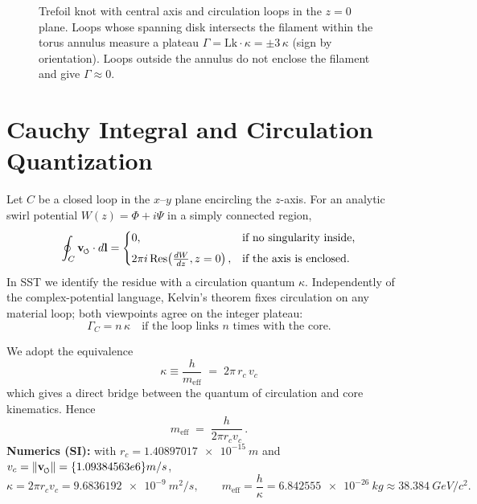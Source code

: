\documentclass[reprint,aps,onecolumn,nofootinbib]{revtex4-2}
\newcommand{\swirlarrow}{%
    \mathchoice{\mkern-2mu\scriptstyle\boldsymbol{\circlearrowleft}}%
    {\mkern-2mu\scriptstyle\boldsymbol{\circlearrowleft}}%
    {\mkern-2mu\scriptscriptstyle\boldsymbol{\circlearrowleft}}%
    {\mkern-2mu\scriptscriptstyle\boldsymbol{\circlearrowleft}}%
}
\newcommand{\vswirl}{\mathbf{v}_{\swirlarrow}}
\begin{document}
\begin{figure}[htbp]
        \caption{Trefoil knot with central axis and circulation loops in the \(z{=}0\) plane.
        Loops whose spanning disk intersects the filament within the torus annulus measure a plateau \(\Gamma=\mathrm{Lk}\cdot\kappa=\pm 3\,\kappa\) (sign by orientation).
        Loops outside the annulus do not enclose the filament and give \(\Gamma\approx 0\).}
        \label{fig:trefoil_axis_plateau_clean}
    \end{figure}


\section{Cauchy Integral and Circulation Quantization}
    Let $C$ be a closed loop in the $x$–$y$ plane encircling the $z$-axis. For an analytic swirl potential $W(z)=\Phi+i\Psi$ in a simply connected region,
    \begin{equation}
        \oint_C \vswirl \cdot d\mathbf{l} =
        \begin{cases}
            0, & \text{if no singularity inside,}\\[4pt]
            2\pi i\, \mathrm{Res}\!\left(\frac{dW}{dz}, z=0\right), & \text{if the axis is enclosed.}
        \end{cases}\label{eq:cauchy-circulation}
    \end{equation}
    In SST we identify the residue with a circulation quantum $\kappa$. Independently of the complex-potential language, Kelvin’s theorem fixes circulation on any material loop; both viewpoints agree on the integer plateau:
    \begin{equation}
        \Gamma_C = n\,\kappa \quad \text{if the loop links $n$ times with the core.}
        \label{eq:circulation-quantization}
    \end{equation}

    \begin{tcolorbox}[title=\textbf{Canonical identification of $\kappa$ (SST)}]
        We adopt the equivalence
        \[
            \boxed{\;\kappa \equiv \frac{h}{m_{\text{eff}}} \;=\; 2\pi\, r_c\, v_c\;}
        \]
        which gives a direct bridge between the quantum of circulation and core kinematics. Hence
        \[
            m_{\text{eff}} \;=\; \frac{h}{2\pi r_c v_c}\,.
        \]
        \textbf{Numerics (SI):} with $r_c=\qty{1.40897017e-15}{m}$ and $v_c=\lVert \mathbf{v}_{\swirlarrow}\rVert=\qty{1.09384563e6}{m/s}$,
        \[
            \kappa=2\pi r_c v_c=\qty{9.6836192e-9}{m^2/s},\qquad
            m_{\text{eff}}=\frac{h}{\kappa}=\qty{6.842555e-26}{kg}\approx\qty{38.384}{GeV/c^2}.
        \]
    \end{tcolorbox}
\end{document}
